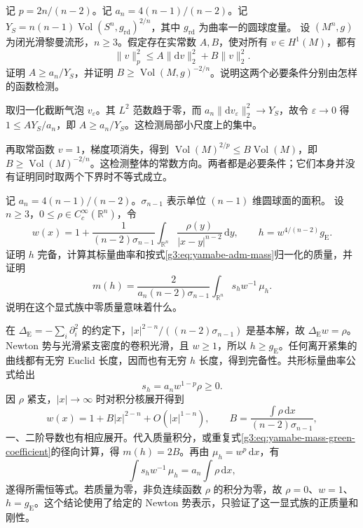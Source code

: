 \begin{exercise}\label{g3:ex:yamabe-near-sharp-coefficient}
	记 \(p=2n/(n-2)\)。记 \(a_n=4(n-1)/(n-2)\)。记 \(Y_S=n(n-1)\operatorname{Vol}(S^n,g_{\mathrm{rd}})^{2/n}\)，其中 \(g_{\mathrm{rd}}\) 为曲率一的圆球度量。
	设 \((M^n,g)\) 为闭光滑黎曼流形，\(n\ge3\)。假定存在实常数 \(A,B\)，使对所有 \(v\in H^1(M)\)，都有
	\[
		\|v\|_p^2\le A\|\mathrm dv\|_2^2+B\|v\|_2^2.
	\]
	证明 \(A\ge a_n/Y_S\)，并证明 \(B\ge\operatorname{Vol}(M,g)^{-2/n}\)。说明这两个必要条件分别由怎样的函数检测。
\end{exercise}
\begin{solution}
	取归一化截断气泡 \(v_\varepsilon\)。其 \(L^2\) 范数趋于零，而 \(a_n\|\mathrm dv_\varepsilon\|_2^2\to Y_S\)，故令 \(\varepsilon\to0\) 得 \(1\le A Y_S/a_n\)，即 \(A\ge a_n/Y_S\)。这检测局部小尺度上的集中。

	再取常函数 \(v=1\)，梯度项消失，得到 \(\operatorname{Vol}(M)^{2/p}\le B\operatorname{Vol}(M)\)，即 \(B\ge\operatorname{Vol}(M)^{-2/n}\)。这检测整体的常数方向。两者都是必要条件；它们本身并没有证明同时取两个下界时不等式成立。
\end{solution}

\begin{exercise}\label{g3:ex:yamabe-explicit-positive-mass}
	记 \(a_n=4(n-1)/(n-2)\)。\(\sigma_{n-1}\) 表示单位 \((n-1)\) 维圆球面的面积。
	设 \(n\ge3\)，\(0\le\rho\in C_c^\infty(\mathbb R^n)\)，令
	\[
		w(x)=1+\frac1{(n-2)\sigma_{n-1}}
		\int_{\mathbb R^n}\frac{\rho(y)}{|x-y|^{n-2}}\,\mathrm dy,
		\qquad h=w^{4/(n-2)}g_{\mathrm E}.
	\]
	证明 \(h\) 完备，计算其标量曲率和按式\eqref{g3:eq:yamabe-adm-mass}归一化的质量，并证明
	\[
		m(h)=\frac{2}{a_n(n-2)\sigma_{n-1}}
		\int_{\mathbb R^n}s_h w^{-1}\,\mu_h.
	\]
	说明在这个显式族中零质量意味着什么。
\end{exercise}
\begin{solution}
	在 \(\Delta_{\mathrm E}=-\sum_i\partial_i^2\) 的约定下，\(|x|^{2-n}/((n-2)\sigma_{n-1})\) 是基本解，故 \(\Delta_{\mathrm E}w=\rho\)。Newton 势与光滑紧支密度的卷积光滑，且 \(w\ge1\)，所以 \(h\ge g_{\mathrm E}\)。任何离开紧集的曲线都有无穷 Euclid 长度，因而也有无穷 \(h\) 长度，得到完备性。共形标量曲率公式给出
	\[
		s_h=a_nw^{1-p}\rho\ge0.
	\]
	因 \(\rho\) 紧支，\(|x|\to\infty\) 时对积分核展开得到
	\[
		w(x)=1+B|x|^{2-n}+O(|x|^{1-n}),
		\qquad B=\frac{\int\rho\,\mathrm dx}{(n-2)\sigma_{n-1}},
	\]
	一、二阶导数也有相应展开。代入质量积分，或重复式\eqref{g3:eq:yamabe-mass-green-coefficient}的径向计算，得 \(m(h)=2B\)。再由 \(\mu_h=w^p\,\mathrm dx\)，有
	\[
		\int s_hw^{-1}\,\mu_h
		=a_n\int\rho\,\mathrm dx,
	\]
	遂得所需恒等式。若质量为零，非负连续函数 \(\rho\) 的积分为零，故 \(\rho=0\)、\(w=1\)、\(h=g_{\mathrm E}\)。这个结论使用了给定的 Newton 势表示，只验证了这一显式族的正质量和刚性。
\end{solution}

